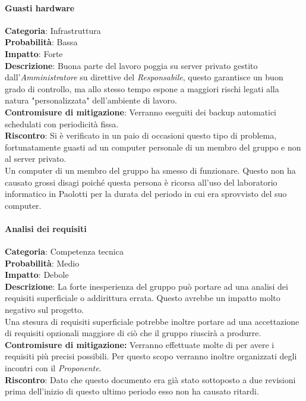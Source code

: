 \documentclass{scalatekids-article}
\begin{document}
\paragraph{Guasti hardware}
\textbf{Categoria}: Infrastruttura\\
\textbf{Probabilità}: Bassa\\
\textbf{Impatto}: Forte\\
\textbf{Descrizione}: Buona parte del lavoro poggia su server privato gestito dall'\textit{Amministratore} su direttive del \textit{Responsabile},
questo garantisce un buon grado di controllo, ma allo stesso tempo espone a maggiori rischi legati alla natura "personalizzata" dell'ambiente di lavoro.\\
\textbf{Contromisure di mitigazione}: Verranno eseguiti dei backup automatici schedulati con periodicità fissa.\\
\textbf{Riscontro}: 
Si è verificato in un paio di occasioni questo tipo di problema, fortunatamente guasti ad un computer personale di un membro del gruppo e non al server privato.\\Un computer di un membro del gruppo ha smesso di funzionare. Questo non ha causato grossi disagi poiché questa persona è ricorsa all'uso del laboratorio informatico in Paolotti per la durata del periodo in cui era sprovvisto del suo computer.
\paragraph{Analisi dei requisiti}
\textbf{Categoria}: Competenza tecnica\\
\textbf{Probabilità}: Medio\\
\textbf{Impatto}: Debole\\
\textbf{Descrizione}: La forte inesperienza del gruppo può portare ad una analisi dei requisiti superficiale o addirittura errata. Questo avrebbe un impatto molto negativo sul progetto.\\Una stesura di requisiti superficiale potrebbe inoltre portare ad una accettazione di requisiti opzionali maggiore di ciò che il gruppo riuscirà a produrre.\\
\textbf{Contromisure di mitigazione:} Verranno effettuate molte  di  per avere i requisiti più precisi possibili. Per questo scopo verranno inoltre organizzati degli incontri con il \textit{Proponente}.\\
\textbf{Riscontro}: Dato che questo documento era già stato sottoposto a due revisioni prima dell'inizio di questo ultimo periodo esso non ha causato ritardi.\\
\end{document}
